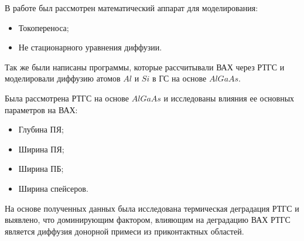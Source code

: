 \Conclusion
В работе был рассмотрен математический аппарат для моделирования:
\begin{itemize}
	\item Токопереноса;
	\item Не стационарного уравнения диффузии.
\end{itemize}
Так же были написаны программы, которые рассчитывали ВАХ через РТГС и моделировали диффузию атомов $Al$ и $Si$ в ГС на основе $AlGaAs$.

Была рассмотрена РТГС на основе $AlGaAs$ и исследованы влияния ее основных параметров на ВАХ:
\begin{itemize}
	\item Глубина ПЯ;
	\item Ширина ПЯ;
	\item Ширина ПБ;
	\item Ширина спейсеров.
\end{itemize}

На основе полученных данных была исследована термическая деградация РТГС и выявлено, что доминирующим фактором, влияющим на деградацию ВАХ РТГС является диффузия донорной примеси из приконтактных областей.